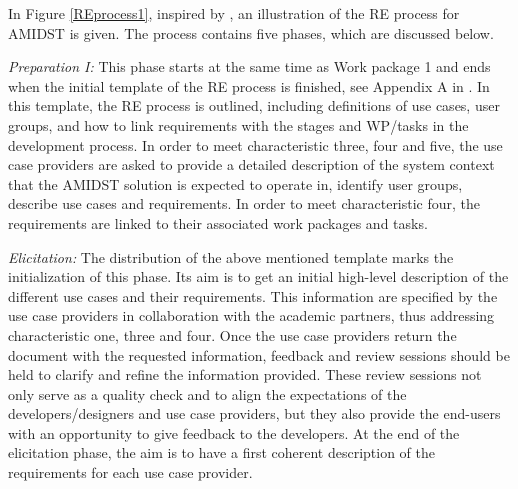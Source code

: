 In Figure \ref{REprocess1}, inspired by \cite{Ebe10}, an illustration of the RE process for AMIDST is given.  The process 
contains five phases, which are discussed below.

\emph{Preparation I:}  This phase starts at the same time as Work package 1 and ends when the initial template of the RE process is finished,
see Appendix A in \cite{Fer14}.  In this template, the RE process
is outlined, including definitions of use cases, user groups, and how to link requirements with the stages and WP/tasks
in the development process.  In order to meet characteristic three, four and five, the use case providers are asked to
provide a detailed description of the system context that the AMIDST solution is expected to operate in, identify user
groups, describe use cases and requirements.  In order to meet characteristic four, the requirements are linked to their
associated work packages and tasks. 

\emph{Elicitation:} The distribution of the above mentioned template marks the initialization of this phase.  Its aim is
to get an initial high-level description of the different use cases and their requirements. This information are
specified by the use case providers in collaboration with the academic partners, thus addressing characteristic one,
three and four.  Once the use case providers return the document with the requested information, feedback and
review sessions should be held to clarify and refine the information provided. These review sessions not only serve as a
quality check and to align the expectations of the developers/designers and use case providers, but they also provide the 
end-users with an
opportunity to give feedback to the developers.  At the end of the elicitation phase, the
aim is to have a first coherent description of the requirements for each use case provider. 


